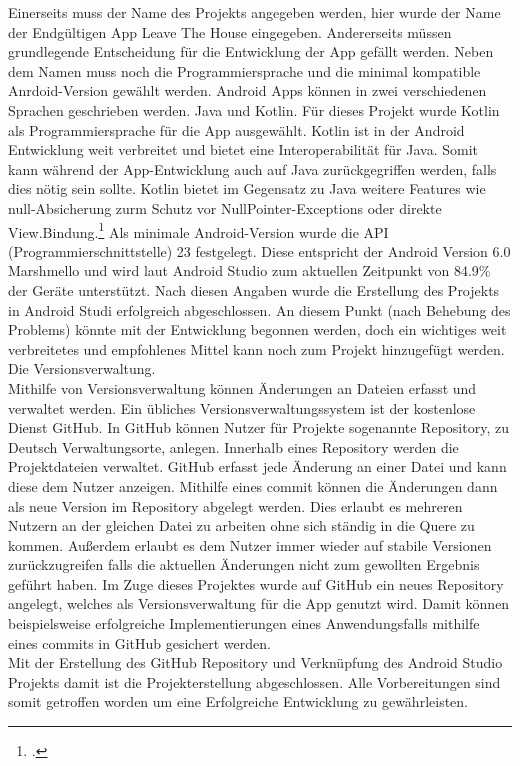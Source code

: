 Einerseits muss der Name des Projekts angegeben werden, hier wurde der Name der Endgültigen App \glqq Leave The House\grqq{} eingegeben. Andererseits müssen grundlegende Entscheidung für die Entwicklung der App gefällt werden. Neben dem Namen muss noch die Programmiersprache und die minimal kompatible Anrdoid-Version gewählt werden. Android Apps können in zwei verschiedenen Sprachen geschrieben werden. Java und Kotlin. Für dieses Projekt wurde Kotlin als Programmiersprache für die App ausgewählt. Kotlin ist in der Android Entwicklung weit verbreitet und bietet eine Interoperabilität für Java. Somit kann während der App-Entwicklung auch auf Java zurückgegriffen werden, falls dies nötig sein sollte. Kotlin bietet im Gegensatz zu Java weitere Features wie null-Absicherung zurm Schutz vor NullPointer-Exceptions oder direkte View.Bindung.\footcite{Kotlin.2020} Als minimale Android-Version wurde die \ac{API} (Programmierschnittstelle) 23 festgelegt. Diese entspricht der Android Version 6.0 Marshmello und wird laut Android Studio zum aktuellen Zeitpunkt von 84.9\% der Geräte unterstützt. Nach diesen Angaben wurde die Erstellung des Projekts in Android Studi erfolgreich abgeschlossen. An diesem Punkt (nach Behebung des Problems) könnte mit der Entwicklung begonnen werden, doch ein wichtiges weit verbreitetes und empfohlenes Mittel kann noch zum Projekt hinzugefügt werden. Die Versionsverwaltung.\\
Mithilfe von Versionsverwaltung können Änderungen an Dateien erfasst und verwaltet werden. Ein übliches Versionsverwaltungssystem ist der kostenlose Dienst GitHub. In GitHub können Nutzer für Projekte sogenannte \glqq Repository\grqq, zu Deutsch Verwaltungsorte, anlegen. Innerhalb eines Repository werden die Projektdateien verwaltet. GitHub erfasst jede Änderung an einer Datei und kann diese dem Nutzer anzeigen. Mithilfe eines commit können die Änderungen dann als neue Version im Repository abgelegt werden. Dies erlaubt es mehreren Nutzern an der gleichen Datei zu arbeiten ohne sich ständig in die Quere zu kommen. Außerdem erlaubt es dem Nutzer immer wieder auf stabile Versionen zurückzugreifen falls die aktuellen Änderungen nicht zum gewollten Ergebnis geführt haben. Im Zuge dieses Projektes wurde auf GitHub ein neues Repository angelegt, welches als Versionsverwaltung für die App genutzt wird. Damit können beispielsweise erfolgreiche Implementierungen eines Anwendungsfalls mithilfe eines commits in GitHub gesichert werden.\\
Mit der Erstellung des GitHub Repository und Verknüpfung des Android Studio Projekts damit ist die Projekterstellung abgeschlossen. Alle Vorbereitungen sind somit getroffen worden um eine Erfolgreiche Entwicklung zu gewährleisten.


